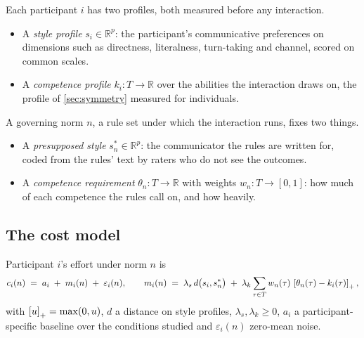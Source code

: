 Each participant $i$ has two profiles, both measured before any interaction.
\begin{itemize}[leftmargin=*]
\item A \emph{style profile} $s_i \in \mathbb{R}^{p}$: the participant's communicative preferences on dimensions such as directness, literalness, turn-taking and channel, scored on common scales.
\item A \emph{competence profile} $k_i \colon T \to \mathbb{R}$ over the abilities the interaction draws on, the profile of \autoref{sec:symmetry} measured for individuals.
\end{itemize}
A governing norm $n$, a rule set under which the interaction runs, fixes two things.
\begin{itemize}[leftmargin=*]
\item A \emph{presupposed style} $s^{*}_n \in \mathbb{R}^{p}$: the communicator the rules are written for, coded from the rules' text by raters who do not see the outcomes.
\item A \emph{competence requirement} $\theta_n \colon T \to \mathbb{R}$ with weights $w_n \colon T \to [0, 1]$: how much of each competence the rules call on, and how heavily.
\end{itemize}

\subsection{The cost model}

\begin{hypothesis}
\label{hyp:cost}
Participant $i$'s effort under norm $n$ is
\begin{equation}
\label{eq:cost}
c_i(n) \;=\; a_i \;+\; m_i(n) \;+\; \varepsilon_i(n), \qquad
m_i(n) \;=\; \lambda_s\, d\big(s_i, s^{*}_n\big) \;+\; \lambda_k \sum_{\tau \in T} w_n(\tau)\, \left[\theta_n(\tau) - k_i(\tau)\right]_{+},
\end{equation}
with $\left[u\right]_{+} = \max(0, u)$, $d$ a distance on style profiles, $\lambda_s, \lambda_k \ge 0$, $a_i$ a participant-specific baseline over the conditions studied and $\varepsilon_i(n)$ zero-mean noise.
\end{hypothesis}

